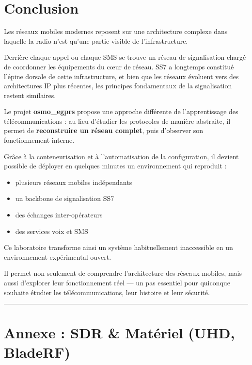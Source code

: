 \documentclass[
]{article}
\providecommand{\tightlist}{%
  \setlength{\itemsep}{0pt}\setlength{\parskip}{0pt}}
\begin{document}
\section{Conclusion}\label{conclusion}

Les réseaux mobiles modernes reposent sur une architecture complexe dans
laquelle la radio n'est qu'une partie visible de l'infrastructure.

Derrière chaque appel ou chaque SMS se trouve un réseau de signalisation
chargé de coordonner les équipements du cœur de réseau. SS7 a longtemps
constitué l'épine dorsale de cette infrastructure, et bien que les
réseaux évoluent vers des architectures IP plus récentes, les principes
fondamentaux de la signalisation restent similaires.

Le projet \textbf{osmo\_egprs} propose une approche différente de
l'apprentissage des télécommunications : au lieu d'étudier les
protocoles de manière abstraite, il permet de \textbf{reconstruire un
réseau complet}, puis d'observer son fonctionnement interne.

Grâce à la conteneurisation et à l'automatisation de la configuration,
il devient possible de déployer en quelques minutes un environnement qui
reproduit :

\begin{itemize}
\tightlist
\item
  plusieurs réseaux mobiles indépendants
\item
  un backbone de signalisation SS7
\item
  des échanges inter-opérateurs
\item
  des services voix et SMS
\end{itemize}

Ce laboratoire transforme ainsi un système habituellement inaccessible
en un environnement expérimental ouvert.

Il permet non seulement de comprendre l'architecture des réseaux
mobiles, mais aussi d'explorer leur fonctionnement réel --- un pas
essentiel pour quiconque souhaite étudier les télécommunications, leur
histoire et leur sécurité.

\begin{center}\rule{0.5\linewidth}{0.5pt}\end{center}

\section{Annexe : SDR \& Matériel (UHD,
BladeRF)}\label{annexe-sdr-matuxe9riel-uhd-bladerf}
\end{document}
